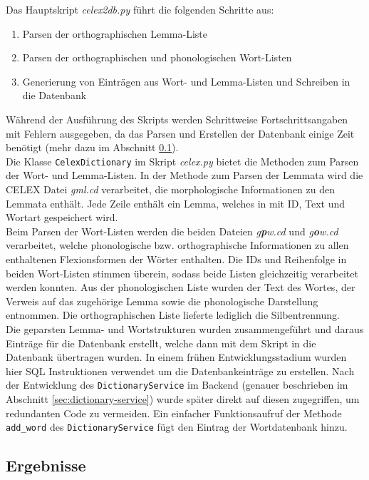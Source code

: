 Das Hauptskript \textit{celex2db.py} führt die folgenden Schritte aus:
\begin{enumerate}
	\item Parsen der orthographischen Lemma-Liste
	\item Parsen der orthographischen und phonologischen Wort-Listen
	\item Generierung von Einträgen aus Wort- und Lemma-Listen und Schreiben in die Datenbank
\end{enumerate}

Während der Ausführung des Skripts werden Schrittweise Fortschrittsangaben mit Fehlern ausgegeben, da das Parsen und Erstellen der Datenbank einige Zeit benötigt (mehr dazu im Abschnitt \ref{sec:database-results}).\\

Die Klasse \texttt{CelexDictionary} im Skript \textit{celex.py} bietet die Methoden zum Parsen der Wort- und Lemma-Listen. In der Methode zum Parsen der Lemmata wird die CELEX Datei \textit{gml.cd} verarbeitet, die morphologische Informationen zu den Lemmata enthält. Jede Zeile enthält ein Lemma, welches in mit ID, Text und Wortart gespeichert wird.\\
Beim Parsen der Wort-Listen werden die beiden Dateien \textit{g\textbf{p}w.cd} und \textit{g\textbf{o}w.cd} verarbeitet, welche phonologische bzw. orthographische Informationen zu allen enthaltenen Flexionsformen der Wörter enthalten. Die IDs und Reihenfolge in beiden Wort-Listen stimmen überein, sodass beide Listen gleichzeitig verarbeitet werden konnten. Aus der phonologischen Liste wurden der Text des Wortes, der Verweis auf das zugehörige Lemma sowie die phonologische Darstellung entnommen. Die orthographischen Liste lieferte lediglich die Silbentrennung.\\
Die geparsten Lemma- und Wortstrukturen wurden zusammengeführt und daraus Einträge für die Datenbank erstellt, welche dann mit dem Skript  in die Datenbank übertragen wurden. In einem frühen Entwicklungsstadium wurden hier SQL Instruktionen verwendet um die Datenbankeinträge zu erstellen. Nach der Entwicklung des \texttt{DictionaryService} im Backend (genauer beschrieben im Abschnitt \ref{sec:dictionary-service}) wurde später direkt auf diesen zugegriffen, um redundanten Code zu vermeiden. Ein einfacher Funktionsaufruf der Methode \texttt{add\_word} des \texttt{DictionaryService} fügt den Eintrag der Wortdatenbank hinzu.

\subsection{Ergebnisse}
\label{sec:database-results}

